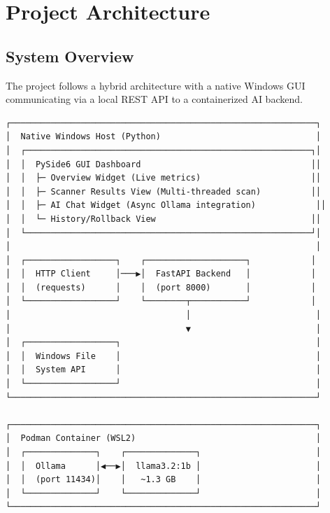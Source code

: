 \documentclass[11pt,a4paper]{article}
\begin{document}
\section{Project Architecture}

\subsection{System Overview}
The project follows a hybrid architecture with a native Windows GUI communicating via a local REST API to a containerized AI backend.

\begin{tcolorbox}[colback=white!95!black,title=Architecture Diagram]
\begin{verbatim}
┌─────────────────────────────────────────────────────────────┐
│  Native Windows Host (Python)                               │
│  ┌─────────────────────────────────────────────────────────┐│
│  │  PySide6 GUI Dashboard                                  ││
│  │  ├─ Overview Widget (Live metrics)                      ││
│  │  ├─ Scanner Results View (Multi-threaded scan)          ││
│  │  ├─ AI Chat Widget (Async Ollama integration)            ││
│  │  └─ History/Rollback View                               ││
│  └─────────────────────────────────────────────────────────┘│
│                                                             │
│  ┌──────────────────┐    ┌────────────────────┐            │
│  │  HTTP Client     │───▶│  FastAPI Backend   │            │
│  │  (requests)      │    │  (port 8000)       │            │
│  └──────────────────┘    └────────┬───────────┘            │
│                                   │                         │
│                                   ▼                         │
│  ┌──────────────────┐                                       │
│  │  Windows File    │                                       │
│  │  System API      │                                       │
│  └──────────────────┘                                       │
└─────────────────────────────────────────────────────────────┘

┌─────────────────────────────────────────────────────────────┐
│  Podman Container (WSL2)                                    │
│  ┌──────────────┐    ┌──────────────┐                       │
│  │  Ollama      │◀──▶│  llama3.2:1b │                       │
│  │  (port 11434)│    │   ~1.3 GB    │                       │
│  └──────────────┘    └──────────────┘                       │
└─────────────────────────────────────────────────────────────┘
\end{verbatim}
\end{tcolorbox}
\end{document}
